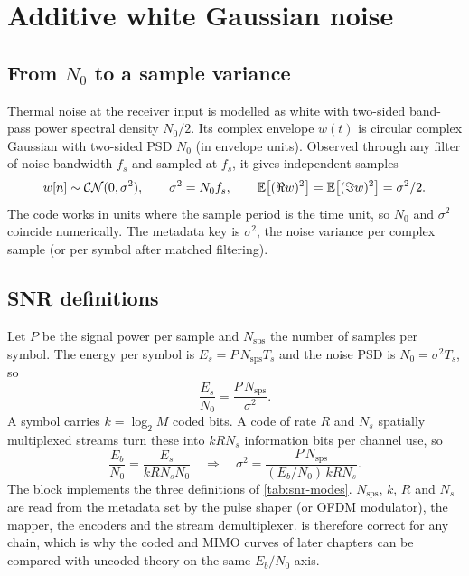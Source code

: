 \section{Additive white Gaussian noise}\label{sec:awgn}
\subsection{From $N_0$ to a sample variance}
Thermal noise at the receiver input is modelled as white with two-sided band-pass power
spectral density $N_0/2$. Its complex envelope $w(t)$ is circular complex Gaussian with
two-sided PSD $N_0$ (in envelope units). Observed through any filter of noise bandwidth $f_s$
and sampled at $f_s$, it gives independent samples
\begin{equation}
  w[n]\sim\mathcal{CN}(0,\sigma^2),\qquad \sigma^2=N_0 f_s,
  \qquad \mathbb{E}\big[(\Re w)^2\big]=\mathbb{E}\big[(\Im w)^2\big]=\sigma^2/2 .
  \label{eq:sample-variance}
\end{equation}
The code works in units where the sample period is the time unit, so $N_0$ and $\sigma^2$
coincide numerically. The metadata key  is $\sigma^2$, the noise variance per
complex sample (or per symbol after matched filtering).

\subsection{SNR definitions}
Let $P$ be the signal power per sample and $N_{\mathrm{sps}}$ the number of samples per symbol.
The energy per symbol is $E_s=P\,N_{\mathrm{sps}}T_s$ and the noise PSD is
$N_0=\sigma^2 T_s$, so
\begin{equation}
  \frac{E_s}{N_0}=\frac{P\,N_{\mathrm{sps}}}{\sigma^2}.
  \label{eq:esn0}
\end{equation}
A symbol carries $k=\log_2 M$ coded bits. A code of rate $R$ and $N_s$ spatially multiplexed
streams turn these into $k R N_s$ information bits per channel use, so
\begin{equation}
  \frac{E_b}{N_0}=\frac{E_s}{k R N_s N_0}
  \quad\Longrightarrow\quad
  \sigma^2=\frac{P\,N_{\mathrm{sps}}}{(E_b/N_0)\,k R N_s}.
  \label{eq:ebn0}
\end{equation}
The  block implements the three definitions of \cref{tab:snr-modes}.
$N_{\mathrm{sps}}$, $k$, $R$ and $N_s$ are read from the metadata set by the pulse shaper (or
OFDM modulator), the mapper, the encoders and the stream demultiplexer.  is
therefore correct for any chain, which is why the coded and MIMO curves of later chapters can
be compared with uncoded theory on the same $E_b/N_0$ axis.

